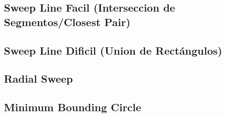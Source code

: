 \subsection{Sweep Line Facil (Interseccion de Segmentos/Closest Pair)}
\begin{code}
\end{code}

\subsection{Sweep Line Dificil (Union de Rectángulos)}
\begin{code}
\end{code}

\subsection{Radial Sweep}
\begin{code}
\end{code}

\subsection{Minimum Bounding Circle}
\begin{code}
\end{code}
